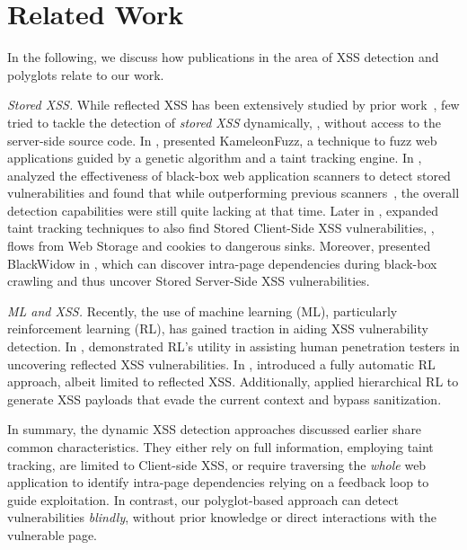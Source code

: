 \newpage 
\section{Related Work}\label{sec:related-work}%
In the following, we discuss how publications in the area of XSS detection and polyglots relate to our work.

\smallskip\textit{Stored XSS.}
While reflected XSS has been extensively studied by prior work~\cite[\eg][]{LekStoJoh13, StoPfiKaiLek+15, stock2017web, MelDasShaBau+18, BenKleBarJoh21, KleBarBen+22, son2013postman, steffens2020pmforce}, few tried to tackle the detection of \emph{stored XSS} dynamically, \ie, without access to the server-side source code.
In \citeyear{duchene2014kameleonfuzz}, \citet{duchene2014kameleonfuzz} presented KameleonFuzz, a technique to fuzz web applications guided by a genetic algorithm and a taint tracking engine.
In \citeyear{parvez2015analysis}, \citet{parvez2015analysis} analyzed the effectiveness of black-box web application scanners to detect stored vulnerabilities and found that while outperforming previous scanners~\cite{doupe2010johnny, bau2010state}, the overall detection capabilities were still quite lacking at that time.
Later in \citeyear{SteRosJohSto+19}, \citet{SteRosJohSto+19} expanded taint tracking techniques to also find Stored Client-Side XSS vulnerabilities, \ie, flows from Web Storage and cookies to dangerous sinks.
Moreover, \citet{eriksson2021black} presented BlackWidow in \citeyear{eriksson2021black}, which can discover intra-page dependencies during black-box crawling and thus uncover Stored Server-Side XSS vulnerabilities.

\textit{ML and XSS\@.}
Recently, the use of machine learning (ML), particularly reinforcement learning (RL), has gained traction in aiding XSS vulnerability detection.
In \citeyear{caturano2021discovering}, \citet{caturano2021discovering} demonstrated RL's utility in assisting human penetration testers in uncovering reflected XSS vulnerabilities. 
In \citeyear{lee2022link}, \citet{lee2022link} introduced a fully automatic RL approach, albeit limited to reflected XSS\@. 
Additionally, \citet{foley2022haxss} applied hierarchical RL to generate XSS payloads that evade the current context and bypass sanitization.


In summary, the dynamic XSS detection approaches discussed earlier share common characteristics.
They either rely on full information, employing taint tracking, are limited to Client-side XSS, or require traversing the \emph{whole} web application to identify intra-page dependencies relying on a feedback loop to guide exploitation.
In contrast, our polyglot-based approach can detect vulnerabilities \emph{blindly}, without prior knowledge or direct interactions with the vulnerable page.

